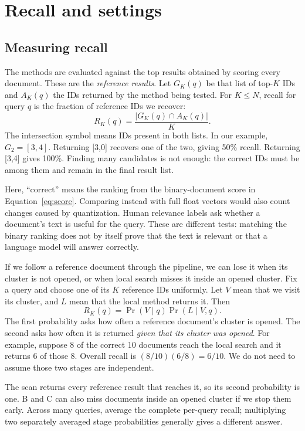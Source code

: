 \section{Recall and settings}
\subsection{Measuring recall}
The methods are evaluated against the top results obtained by scoring every document. These are the \emph{reference results}.
Let $G_K(q)$ be that list of top-$K$ IDs and $A_K(q)$ the IDs returned by the method being tested.
For $K\le N$, recall for query $q$ is the fraction of reference IDs we recover:
\begin{equation}
R_K(q)=\frac{|G_K(q)\cap A_K(q)|}{K}.
\label{eq:recall}
\end{equation}
The intersection symbol means IDs present in both lists. In our example, $G_2=[3,4]$.
Returning [3,0] recovers one of the two, giving 50\% recall. Returning [3,4] gives 100\%.
Finding many candidates is not enough: the correct IDs must be among them and remain in the
final result list.

Here, ``correct'' means the ranking from the binary-document score in
Equation~\ref{eq:score}. Comparing instead with full float vectors would also count changes
caused by quantization. Human relevance labels ask whether a document's text is useful for
the query. These are different tests: matching the binary ranking does not by itself prove
that the text is relevant or that a language model will answer correctly.

If we follow a reference document through the pipeline, we can lose it when its cluster is not
opened, or when local search misses it inside an opened cluster. Fix a query and choose one
of its $K$ reference IDs uniformly. Let $V$ mean that we visit its cluster, and $L$ mean that
the local method returns it. Then
\begin{equation}
R_K(q)=\Pr(V\mid q)\Pr(L\mid V,q).
\label{eq:survival}
\end{equation}
The first probability asks how often a reference document's cluster is opened. The second
asks how often it is returned \emph{given that its cluster was opened}. For example, suppose
8 of the correct 10 documents reach the local search and it returns 6 of those 8. Overall
recall is $(8/10)(6/8)=6/10$. We do not need to assume those two stages are independent.

The scan returns every reference result that reaches it, so its second probability is one.
B and C can also miss documents inside an opened cluster if we stop them early. Across many
queries, average the complete per-query recall; multiplying two separately averaged stage
probabilities generally gives a different answer.

